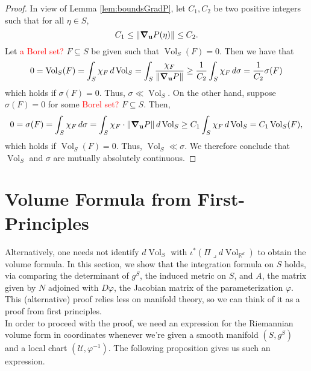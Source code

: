 \documentclass{article}
\newcommand{\R}{\mathbb{R}}
\newcommand{\f}[2]{\frac{#1}{#2}}
\newcommand{\iprod}{\mathbin{\lrcorner}}
\theoremstyle{theorem}
\newcommand{\Vol}{\operatorname{Vol}}
\begin{document}
\begin{proof}
In view of Lemma \ref{lem:boundsGradP}, let $C_1,C_2$ be two positive integers such that for all $\eta\in S$, 
\begin{equation*}
    C_1 \leq \norm{\grad_{\mathbf{u}} P(\eta) } \leq C_2.
\end{equation*}
Let \textcolor{red}{a Borel set?} $F\subseteq S$ be given such that $\Vol_S(F) = 0$. Then we have that
\begin{equation*}
    0 = \Vol_S(F) = \int_S \chi_F \,d\Vol_S = \int_S \f{\chi_F}{\norm{\grad_{\mathbf{u}} P }} \geq \f{1}{C_2}\int_S \chi_F \,d\sigma = \f{1}{C_2}\sigma(F)
\end{equation*}
which holds if $\sigma(F) = 0$. Thus, $\sigma \ll \Vol_S$. On the other hand, suppose $\sigma(F) = 0$ for some \textcolor{red}{Borel set?} $F \subseteq S$. Then,
\begin{equation*}
    0 = \sigma(F) = \int_S \chi_F \,d\sigma= \int_S \chi_F \cdot \norm{\grad_{\mathbf{u}} P } \,d\Vol_S \geq C_1 \int_S \chi_F \,d\Vol_S = C_1 \Vol_S(F),
\end{equation*}
which holds if $\Vol_S(F) = 0$. Thus, $\Vol_S \ll \sigma$. We therefore conclude that $\Vol_S$ and $\sigma$ are mutually absolutely continuous.
\end{proof}











\appendix
\section{Volume Formula from First-Principles}

Alternatively, one needs not identify $d\Vol_S$ with $\iota^* (\Pi \iprod d\Vol_{\R^d})$ to obtain the volume formula. In this section, we show that the integration formula on $S$ holds, via comparing the determinant of $g^S$, the induced metric on $S$, and $A$, the matrix given by $N$ adjoined with $D\varphi$, the Jacobian matrix of the parameterization $\varphi$. This (alternative) proof relies less on manifold theory, so we can think of it as a proof from first principles. \\


In order to proceed with the proof, we need an expression for the Riemannian volume form in coordinates whenever we're given a smooth manifold $(S,g^S)$ and a local chart $(\mathcal{U}, \varphi^{-1})$. The following proposition gives us such an expression.
\end{document}
